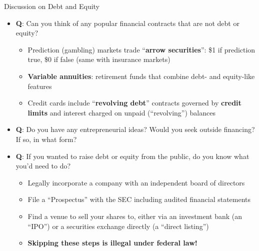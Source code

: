 \documentclass[aspectratio=169]{beamer}
\begin{document}
\begin{frame}{Discussion on Debt and Equity}

    \begin{itemize}
        \item \textbf{Q}: Can you think of any popular financial contracts that are not debt or equity? \pause 
        \begin{itemize}
            \item Prediction (gambling) markets trade ``\textbf{arrow securities}'': \$1 if prediction true, \$0 if false (same with insurance markets)
            \item \textbf{Variable annuities}: retirement funds that combine debt- and equity-like features 
            \item Credit cards include ``\textbf{revolving debt}'' contracts governed by \textbf{credit limits} and interest charged on unpaid (``revolving'') balances 
        \end{itemize}
        \vfill 
        \item \textbf{Q}: Do you have any entrepreneurial ideas? Would you seek outside financing? If so, in what form? \pause 
        \vfill 
        \item \textbf{Q}: If you wanted to raise debt or equity from the public, do you know what you'd need to do? \pause 
        \begin{itemize}
            \item Legally incorporate a company with an independent board of directors 
            \item File a ``Prospectus'' with the SEC including audited financial statements 
            \item Find a venue to sell your shares to, either via an investment bank (an ``IPO'') or a securities exchange directly (a ``direct listing'') 
            \item \textbf{Skipping these steps is illegal under federal law!}
        \end{itemize}
    \end{itemize}
    
\end{frame}
\end{document}
